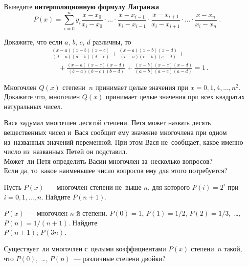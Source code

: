 \begin{problems}

\item
Выведите \textbf{интерполяционную формулу Лагранжа}
\[
    P(x)
=
    \sum_{i=0}^{n}
        y_i
        \frac{x - x_{0}}{x_{i} - x_{0}}
        \cdot \ldots \cdot
        \frac{x - x_{i-1}}{x_{i} - x_{i-1}}
        \cdot
        \frac{x - x_{i+1}}{x_i - x_{i+1}}
        \cdot \ldots \cdot
        \frac{x-x_n}{x_i-x_n}
\; . \]

\item
Докажите, что если $a$, $b$, $c$, $d$ различны, то
\begin{align*} &
    \frac{(x - a)(x - b)(x - c)}{(d - a)(d - b)(d - c)} +
    \frac{(x - a)(x - b)(x - d)}{(c - a)(c - b)(c - d)}
+ \\ & \quad +
    \frac{(x - a)(x - c)(x - d)}{(b - a)(b - c)(b - d)} +
    \frac{(x - b)(x - c)(x - d)}{(a - b)(a - c)(a - d)}
=
    1
\, . \end{align*}

\item
Многочлен $Q(x)$ степени~$n$ принимает целые значения при
$x = 0, 1, 4, \ldots, n^2$.
Докажите что, многочлен $Q(x)$ принимает целые значения при всех квадратах
натуральных чисел.

\item
Вася задумал многочлен десятой степени.
Петя может назвать десять вещественных чисел и~Вася сообщит ему значение
многочлена  при одном из~названных значений переменной.
При этом Вася не~сообщает, какое именно число из~названных Петей он подставил.
\\
\subproblem
Может~ли Петя определить Васин многочлен за~несколько вопросов?
\\
\subproblem
Если да, то~какое наименьшее число вопросов ему для этого потребуется?

\item
Пусть $P(x)$~--- многочлен степени не~выше $n$, для которого $P(i) = 2^i$ при
$i = 0, 1, \ldots, n$.
Найдите $P(n + 1)$.

\item
$P(x)$~--- многочлен $n$-й степени.
$P(0) = 1$, $P(1) = 1 / 2$, $P(2) = 1 / 3$,~\ldots, $P(n) = 1 / (n + 1)$.
Найдите
\\
\subproblem $P(n + 1)$;
\qquad
\subproblem $P(3n)$.

\item
Существует~ли многочлен с~целыми коэффициентами $P(x)$ степени~$n$ такой, что
$P(0)$,~\ldots, $P(n)$~--- различные степени двойки?

\end{problems}

